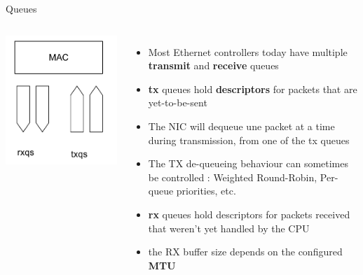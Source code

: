 \begin{frame}{Queues}
	\begin{columns}
		\includegraphics[width=\textwidth]{slides/networking-driver-netdev/queues.pdf}
	\begin{itemize}
		\item Most Ethernet controllers today have multiple \textbf{transmit} and \textbf{receive} queues
		\item \textbf{tx} queues hold \textbf{descriptors} for packets that are yet-to-be-sent
		\item The NIC will dequeue une packet at a time during transmission, from one of the tx queues
		\item The TX de-queueing behaviour can sometimes be controlled : Weighted Round-Robin, Per-queue priorities, etc.
		\item \textbf{rx} queues hold descriptors for packets received that weren't yet handled by the CPU
		\item the RX buffer size depends on the configured \textbf{MTU}
	\end{itemize}
	\end{columns}
\end{frame}

